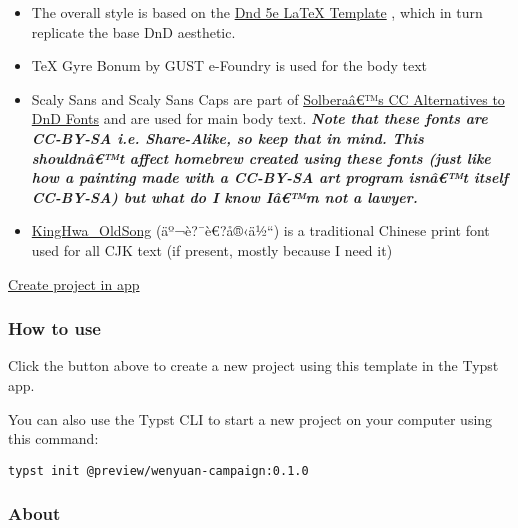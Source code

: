\begin{itemize}
\tightlist
\item
  The overall style is based on the
  \href{https://github.com/rpgtex/DND-5e-LaTeX-Template}{Dnd 5e LaTeX
  Template} , which in turn replicate the base DnD aesthetic.
\item
  TeX Gyre Bonum by GUST e-Foundry is used for the body text
\item
  Scaly Sans and Scaly Sans Caps are part of
  \href{https://github.com/jonathonf/solbera-dnd-fonts}{Solberaâ€™s CC
  Alternatives to DnD Fonts} and are used for main body text.
  \emph{\textbf{Note that these fonts are CC-BY-SA i.e. Share-Alike, so
  keep that in mind. This shouldnâ€™t affect homebrew created using
  these fonts (just like how a painting made with a CC-BY-SA art program
  isnâ€™t itself CC-BY-SA) but what do I know Iâ€™m not a lawyer.}}
\item
  \href{https://zhuanlan.zhihu.com/p/637491623}{KingHwa\_OldSong}
  (äº¬è?¯è€?å®‹ä½``) is a traditional Chinese print font used for all
  CJK text (if present, mostly because I need it)
\end{itemize}

\href{/app?template=wenyuan-campaign&version=0.1.0}{Create project in
app}

\subsubsection{How to use}\label{how-to-use}

Click the button above to create a new project using this template in
the Typst app.

You can also use the Typst CLI to start a new project on your computer
using this command:

\begin{verbatim}
typst init @preview/wenyuan-campaign:0.1.0
\end{verbatim}



\subsubsection{About}\label{about}

